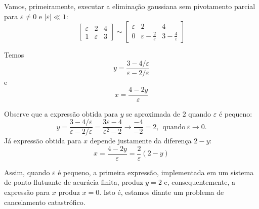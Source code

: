 \begin{sol}
Vamos, primeiramente, executar a eliminação gaussiana sem pivotamento parcial para $\varepsilon \neq 0$ e $|\varepsilon|\ll 1$:
\begin{equation}\left[\begin{array}{cc|c}
\varepsilon & 2 & 4\\
1 & \varepsilon & 3
\end{array}
\right]\sim\left[\begin{array}{cc|c}
\varepsilon & 2 & 4\\
0 & \varepsilon-\frac{2}{\varepsilon} & 3-\frac{4}{\varepsilon}
\end{array}
\right]
\end{equation}

Temos
\begin{equation} y=\frac{3-4/\varepsilon}{\varepsilon-2/\varepsilon}\end{equation}%
e
\begin{equation} x=\frac{4-2y}{\varepsilon}\end{equation} %

Observe que a expressão obtida para  $y$ se aproximada de $2$ quando $\varepsilon$ é pequeno:
\begin{equation} y=\frac{3-4/\varepsilon}{\varepsilon-2/\varepsilon}=\frac{3\varepsilon-4}{\varepsilon^2-2} \longrightarrow \frac{-4}{-2}=2, ~~\text{quando}~\varepsilon \to 0. \end{equation}
Já expressão obtida para $x$ depende justamente da diferença $2-y$:
\begin{equation} x=\frac{4-2y}{\varepsilon}=\frac{2}{\varepsilon} (2-y) \end{equation}

Assim, quando $\varepsilon$ é pequeno, a primeira expressão, implementada em um sistema de ponto flutuante de acurácia finita, produz $y= 2$ e, consequentemente, a expressão para $x$ produz $x=0$. Isto é, estamos diante um problema de cancelamento catastrófico.


\end{sol}
